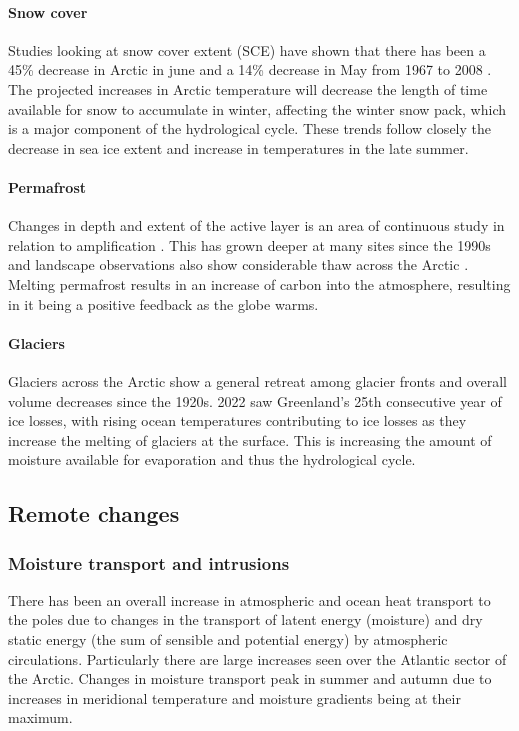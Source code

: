 \documentclass[12pt, oneside]{article}
\begin{document}
\paragraph{Snow cover}

Studies looking at snow cover extent (SCE) have shown that there has been a 45\% decrease in Arctic in june and a 14\% decrease in May from 1967 to 2008 \cite{brown2010multi}. The projected increases in Arctic temperature will decrease the length of time available for snow to accumulate in winter, affecting the winter snow pack, which is a major component of the hydrological cycle. These trends follow closely the decrease in sea ice extent and increase in temperatures in the late summer. 


\paragraph{Permafrost}
Changes in depth and extent of the active layer is an area of continuous study in relation to amplification \cite{bring2016arctic}. This has grown deeper at many sites since the 1990s and landscape observations also show considerable thaw across the Arctic \cite{ananicheva2011snow}. Melting permafrost results in an increase of carbon into the atmosphere, resulting in it being a positive feedback as the globe warms.

\paragraph{Glaciers}
Glaciers across the Arctic show a general retreat among glacier fronts and overall volume decreases since the 1920s. 2022 saw Greenland's 25th consecutive year of ice losses, with rising ocean temperatures contributing to ice losses as they increase the melting of glaciers at the surface\cite{dufour2016atmospheric}. This is increasing the amount of moisture available for evaporation and thus the hydrological cycle.



\subsection{Remote changes}\label{remote}
\subsubsection{Moisture transport and intrusions}
There has been an overall increase in atmospheric and ocean heat transport to the poles due to changes in the transport of latent energy (moisture) and dry static energy (the sum of sensible and potential energy) by atmospheric circulations\cite{mcgraw2020changes}. Particularly there are large increases seen over the Atlantic sector of the Arctic\cite{dufour2016atmospheric}. Changes in moisture transport peak in summer and autumn\cite{bintanja2014future} due to increases in meridional temperature and moisture gradients being at their maximum.
\end{document}
